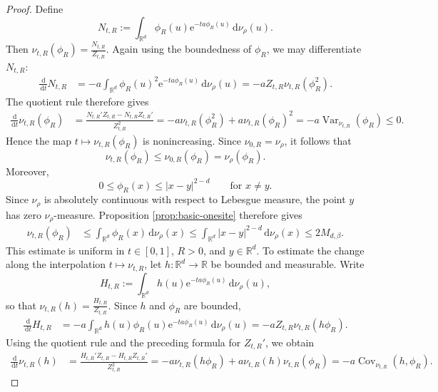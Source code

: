 \documentclass[10pt,a4paper]{amsart}
\newcommand{\R}{\mathbb R}
\newcommand{\Var}{\operatorname{Var}}
\newcommand{\be}{\beta}
\newcommand{\dd}{\,\mathrm d}
\newcommand{\ee}{\mathrm e}
\begin{document}
\begin{proof}
Define
\[
 N_{t,R}
 :=
 \int_{\R^d}\phi_R(u)\ee^{-ta\phi_R(u)}
 \dd\nu_\rho(u).
\]
Then $\nu_{t,R}(\phi_R)=\frac{N_{t,R}}{Z_{t,R}}.$ Again using the boundedness of \(\phi_R\), we may differentiate \(N_{t,R}\):
\begin{align*}
 \frac{\dd}{\dd t}N_{t,R}
 &=
 -a\int_{\R^d}\phi_R(u)^2\ee^{-ta\phi_R(u)}
 \dd\nu_\rho(u)=
 -aZ_{t,R}\nu_{t,R}(\phi_R^2).
\end{align*}
The quotient rule therefore gives
\begin{align*}
 \frac{\dd}{\dd t}\nu_{t,R}(\phi_R)
 &=
 \frac{N_{t,R}'Z_{t,R}-N_{t,R}Z_{t,R}'}
      {Z_{t,R}^2}=
 -a\nu_{t,R}(\phi_R^2)
 +a\nu_{t,R}(\phi_R)^2=
 -a\Var_{\nu_{t,R}}(\phi_R)
 \le0.
\end{align*}
Hence the map \(t\mapsto\nu_{t,R}(\phi_R)\) is nonincreasing.  Since
\(\nu_{0,R}=\nu_\rho\), it follows that
\[
 \nu_{t,R}(\phi_R)
 \le\nu_{0,R}(\phi_R)
 =\nu_\rho(\phi_R).
\]
Moreover,
\[
 0\le\phi_R(x)\le |x-y|^{2-d}
 \qquad\text{for }x\ne y.
\]
Since \(\nu_\rho\) is absolutely continuous with respect to Lebesgue
measure, the point \(y\) has zero \(\nu_\rho\)-measure.  Proposition
\ref{prop:basic-onesite} therefore gives
\begin{align*}
 \nu_{t,R}(\phi_R)
 &\le
 \int_{\R^d}\phi_R(x)\dd\nu_\rho(x)\le
 \int_{\R^d}|x-y|^{2-d}\dd\nu_\rho(x)\le 2M_{d,\be}.
\end{align*}
This estimate is uniform in \(t\in[0,1]\), \(R>0\), and \(y\in\R^d\). To estimate the change along the interpolation
\(t\mapsto\nu_{t,R}\), let \(h:\R^d\to\R\) be bounded and measurable.
Write
\[
 H_{t,R}
 :=
 \int_{\R^d}h(u)\ee^{-ta\phi_R(u)}\dd\nu_\rho(u),
\]
so that $\nu_{t,R}(h)=\frac{H_{t,R}}{Z_{t,R}}.$
Since \(h\) and \(\phi_R\) are bounded,
\begin{align*}
 \frac{\dd}{\dd t}H_{t,R}
 &=
 -a\int_{\R^d}h(u)\phi_R(u)
 \ee^{-ta\phi_R(u)}\dd\nu_\rho(u)=
 -aZ_{t,R}\nu_{t,R}(h\phi_R).
\end{align*}
Using the quotient rule and the preceding formula for \(Z_{t,R}'\), we
obtain
\begin{align*}
 \frac{\dd}{\dd t}\nu_{t,R}(h)
 &=
 \frac{H_{t,R}'Z_{t,R}-H_{t,R}Z_{t,R}'}
      {Z_{t,R}^2}=
 -a\nu_{t,R}(h\phi_R)
 +a\nu_{t,R}(h)\nu_{t,R}(\phi_R)=
 -a\operatorname{Cov}_{\nu_{t,R}}(h,\phi_R).
\end{align*}


\end{proof}
\end{document}
